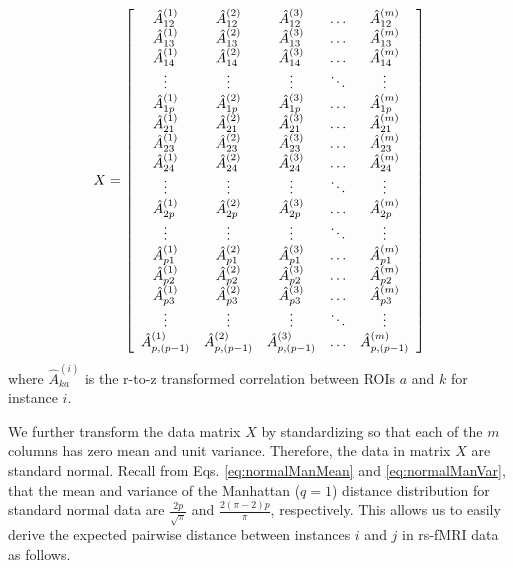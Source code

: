 \documentclass[10pt,letterpaper]{article}\usepackage[]{graphicx}\usepackage[]{color}
\begin{document}
\begin{equation}\label{eq:rs-fMRI_matrix}
X = \left[
\begin{array}{c c c c c}
\hat{A}^{(1)}_{12} & \hat{A}^{(2)}_{12} & \hat{A}^{(3)}_{12} & \dots & \hat{A}^{(m)}_{12} \\
\hat{A}^{(1)}_{13} & \hat{A}^{(2)}_{13} & \hat{A}^{(3)}_{13} & \dots & \hat{A}^{(m)}_{13} \\
\hat{A}^{(1)}_{14} & \hat{A}^{(2)}_{14} & \hat{A}^{(3)}_{14} & \dots & \hat{A}^{(m)}_{14} \\
\vdots & \vdots & \vdots & \ddots & \vdots \\
\hat{A}^{(1)}_{1p} & \hat{A}^{(2)}_{1p} & \hat{A}^{(3)}_{1p} & \dots & \hat{A}^{(m)}_{1p} \\
\hat{A}^{(1)}_{21} & \hat{A}^{(2)}_{21} & \hat{A}^{(3)}_{21} & \dots & \hat{A}^{(m)}_{21} \\
\hat{A}^{(1)}_{23} & \hat{A}^{(2)}_{23} & \hat{A}^{(3)}_{23} & \dots & \hat{A}^{(m)}_{23} \\
\hat{A}^{(1)}_{24} & \hat{A}^{(2)}_{24} & \hat{A}^{(3)}_{24} & \dots & \hat{A}^{(m)}_{24} \\
\vdots & \vdots & \vdots & \ddots & \vdots \\
\hat{A}^{(1)}_{2p} & \hat{A}^{(2)}_{2p} & \hat{A}^{(3)}_{2p} & \dots & \hat{A}^{(m)}_{2p} \\
\vdots & \vdots & \vdots & \ddots & \vdots \\
\hat{A}^{(1)}_{p1} & \hat{A}^{(2)}_{p1} & \hat{A}^{(3)}_{p1} & \dots & \hat{A}^{(m)}_{p1} \\
\hat{A}^{(1)}_{p2} & \hat{A}^{(2)}_{p2} & \hat{A}^{(3)}_{p2} & \dots & \hat{A}^{(m)}_{p2} \\
\hat{A}^{(1)}_{p3} & \hat{A}^{(2)}_{p3} & \hat{A}^{(3)}_{p3} & \dots & \hat{A}^{(m)}_{p3} \\
\vdots & \vdots & \vdots & \ddots & \vdots \\
\hat{A}^{(1)}_{p,(p-1)} & \hat{A}^{(2)}_{p,(p-1)} & \hat{A}^{(3)}_{p,(p-1)} & \dots & \hat{A}^{(m)}_{p,(p-1)}
\end{array}
\right]
\end{equation}
where $\hat{A}^{(i)}_{ka}$ is the r-to-z transformed correlation between ROIs $a$ and $k$ for instance $i$.

We further transform the data matrix $X$ by standardizing so that each of the $m$ columns has zero mean and unit variance. Therefore, the data in matrix $X$ are standard normal. Recall from Eqs. \ref{eq:normalManMean} and \ref{eq:normalManVar}, that the mean and variance of the Manhattan ($q=1$) distance distribution for standard normal data are $\frac{2p}{\sqrt{\pi}}$ and $\frac{2(\pi - 2)p}{\pi}$, respectively. This allows us to easily derive the expected pairwise distance between instances $i$ and $j$ in rs-fMRI data as follows.
\end{document}
